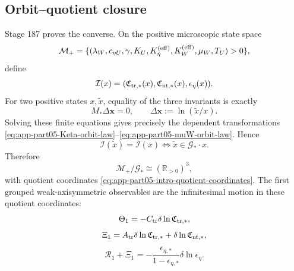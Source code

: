 \subsection{Orbit--quotient closure}
Stage 187 proves the converse.  On the positive microscopic state space
\begin{equation}
\label{eq:app-part05-positive-state-space}
\mathcal M_+
=
\{(\lambda_W,c_{\eta U},\gamma,K_U,K_\eta^{({\rm eff})},K_W^{({\rm eff})},\mu_W,T_U)>0\},
\end{equation}
define
\begin{equation}
\label{eq:app-part05-invariant-map}
\mathcal I(x)
=
(\mathfrak C_{{\rm tr},*}(x),\mathfrak C_{{\rm nt},*}(x),\epsilon_\eta(x)).
\end{equation}
For two positive states \(x,\widetilde x\), equality of the three invariants is exactly
\begin{equation}
\label{eq:app-part05-finite-fibre-equations}
M_*\Delta\mathbf x=0,
\qquad
\Delta\mathbf x:=\ln(\widetilde x/x).
\end{equation}
Solving these finite equations gives precisely the dependent transformations \eqref{eq:app-part05-Keta-orbit-law}--\eqref{eq:app-part05-muW-orbit-law}.  Hence
\begin{equation}
\label{eq:app-part05-orbit-fibre-theorem}
\mathcal I(\widetilde x)=\mathcal I(x)
\iff
\widetilde x\in\mathcal G_*\cdot x.
\end{equation}
Therefore
\begin{equation}
\label{eq:app-part05-quotient-space}
\mathcal M_+/\mathcal G_*
\cong
(\mathbb R_{>0})^3,
\end{equation}
with quotient coordinates \eqref{eq:app-part05-intro-quotient-coordinates}.  The first grouped weak-axisymmetric observables are the infinitesimal motion in these quotient coordinates:
\begin{equation}
\label{eq:app-part05-observables-quotient}
\Theta_1=-C_{\rm tr}\delta\ln\mathfrak C_{{\rm tr},*},
\end{equation}
\begin{equation}
\label{eq:app-part05-Xi-quotient}
\Xi_1=A_{\rm tr}\delta\ln\mathfrak C_{{\rm tr},*}+\delta\ln\mathfrak C_{{\rm nt},*},
\end{equation}
\begin{equation}
\label{eq:app-part05-R-quotient}
\mathcal R_1+\Xi_1
=-\frac{\epsilon_{\eta,*}}{1-\epsilon_{\eta,*}}\delta\ln\epsilon_\eta.
\end{equation}

